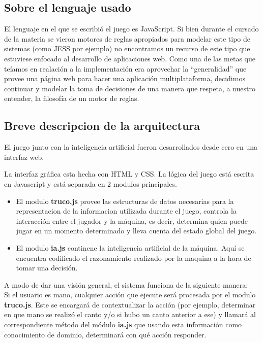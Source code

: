 \documentclass[12pt,a4paper]{article}
\begin{document}
\subsection{Sobre el lenguaje usado}
El lenguaje en el que se escribi\'o el juego es JavaScript. Si bien durante el cursado de la materia se vieron motores de reglas 
apropiados para modelar este tipo de sistemas (como JESS por ejemplo) no encontramos un recurso de este tipo que estuviese enfocado
al desarrollo de aplicaciones web. Como una de las metas que te\'iamos en realaci\'on a la implementaci\'on era aprovechar la ``generalidad'' que
provee una p\'agina web para hacer una aplicaci\'on multiplataforma, decidimos continuar y modelar la toma de decisiones de 
una manera que respeta, a nuestro entender, la filosof\'ia de un motor de reglas.

\subsection{Breve descripcion de la arquitectura}
El juego junto con la inteligencia artificial fueron desarrollados desde cero en una interfaz web. 

La interfaz gr\'afica esta hecha con HTML y CSS. La l\'ogica del juego est\'a escrita en Javascript y est\'a separada en 2 modulos principales.  
\begin{itemize}
\item El modulo \textbf{truco.js} provee las estructuras de datos necesarias para la representacion de la informacion utilizada durante el juego,
controla la interacci\'on entre el jugador y la m\'aquina, es decir, determina quien puede jugar en un momento determinado y lleva cuenta del
estado global del juego.

\item El modulo \textbf{ia.js} continene la inteligencia artificial de la m\'aquina. Aqu\'i se encuentra codificado el razonamiento realizado por la maquina
a la hora de tomar una decisi\'on.

\end{itemize}

A modo de dar una visi\'on general, el sistema funciona de la siguiente manera: \\
Si el usuario es mano, cualquier acci\'on que ejecute ser\'a procesada por el modulo \textbf{truco.js}. Este se encargar\'a de contextualizar la
acci\'on (por ejemplo, determinar en que mano se realiz\'o el canto y/o si hubo un canto anterior a ese) y llamar\'a al correspondiente m\'etodo del
m\'odulo \textbf{ia.js} que usando esta informaci\'on como conocimiento de dominio, determinar\'a con qu\'e acci\'on responder.
\end{document}
